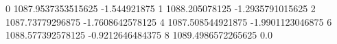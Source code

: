 0 1087.9537353515625 -1.544921875
1 1088.205078125 -1.2935791015625
2 1087.73779296875 -1.7608642578125
4 1087.508544921875 -1.9901123046875
6 1088.577392578125 -0.9212646484375
8 1089.4986572265625 0.0

